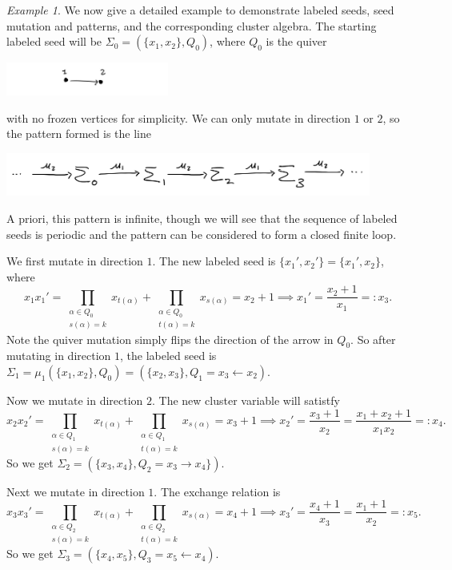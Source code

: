\documentclass[12pt]{amsart}
\theoremstyle{remark}
\theoremstyle{remark}
\newtheorem*{example}{Example}
\begin{document}
\begin{example}
We now give a detailed example to demonstrate labeled seeds, seed mutation and patterns, and the corresponding cluster algebra.
The starting labeled seed will be $\Sigma_0 = (\{x_1, x_2\}, Q_0)$, where $Q_0$ is the quiver 

\centerline{\includegraphics[width=0.4\textwidth]{simple_quiver}}

\noindent
with no frozen vertices for simplicity.
We can only mutate in direction $1$ or $2$, so the pattern formed is the line

\includegraphics[width=0.9\textwidth]{simple_pattern}

\noindent
A priori, this pattern is infinite, though we will see that the sequence of labeled seeds is periodic and the pattern can be considered to form a closed finite loop.

We first mutate in direction $1$.
The new labeled seed is $\{x_1', x_2'\} = \{x_1', x_2\}$, where
$$x_1 x_1' = \prod_{\substack{\alpha \in Q_0 \\ s(\alpha) = k}} x_{t(\alpha)} + \prod_{\substack{\alpha \in Q_0 \\ t(\alpha) = k}} x_{s(\alpha)} = x_2 + 1 
\implies x_1' = \frac{x_2 + 1}{x_1} =: x_3.$$
Note the quiver mutation simply flips the direction of the arrow in $Q_0$.
So after mutating in direction $1$, the labeled seed is $\Sigma_1 = \mu_1(\{x_1, x_2\}, Q_0) = (\{x_2, x_3\}, Q_1 = x_3 \leftarrow x_2)$.

Now we mutate in direction $2$.
The new cluster variable will satistfy
$$x_2 x_2' = \prod_{\substack{\alpha \in Q_1 \\ s(\alpha) = k}} x_{t(\alpha)} + \prod_{\substack{\alpha \in Q_1 \\ t(\alpha) = k}} x_{s(\alpha)} = x_3 + 1
\implies x_2' = \frac{x_3 + 1}{x_2} = \frac{x_1 + x_2 + 1}{x_1 x_2} =: x_4.$$
So we get $\Sigma_2 = (\{x_3, x_4\}, Q_2 = x_3 \to x_4\})$.

Next we mutate in direction $1$.
The exchange relation is
$$x_3 x_3' =  \prod_{\substack{\alpha \in Q_2 \\ s(\alpha) = k}} x_{t(\alpha)} + \prod_{\substack{\alpha \in Q_2 \\ t(\alpha) = k}} x_{s(\alpha)} = x_4 + 1 
\implies x_3' = \frac{x_4 + 1}{x_3} = \frac{x_1 + 1}{x_2} =: x_5.$$
So we get $\Sigma_3 = (\{x_4, x_5\}, Q_3 = x_5 \leftarrow x_4)$.


\end{example}
\end{document}
